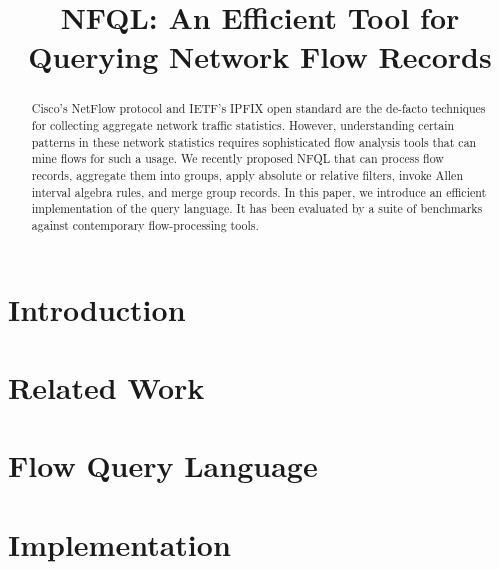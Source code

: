 \documentclass[10pt, conference]{IEEEtran}
\begin{document}
\title{NFQL: An Efficient Tool for Querying Network Flow Records}
\author{ }

\maketitle

\begin{acronym}
\end{acronym}


\begin{abstract} Cisco's NetFlow protocol and IETF's IPFIX open standard are
  the de-facto techniques for collecting aggregate network traffic statistics.
  However, understanding certain patterns in these network statistics requires
  sophisticated flow analysis tools that can mine flows for such a usage. We
  recently proposed \ac{NFQL} that can process flow records, aggregate them
  into groups, apply absolute or relative filters, invoke Allen interval
  algebra rules, and merge group records. In this paper, we introduce an
  efficient implementation of the query language.  It has been evaluated by a
  suite of benchmarks against contemporary flow-processing
  tools.\end{abstract}



\section{Introduction}
\label{sec:introduction}
\section{Related Work}
\label{sec:relatedwork}
\section{Flow Query Language}
\label{sec:design}
\section{Implementation}\label{sec:implementation}

\end{document}
